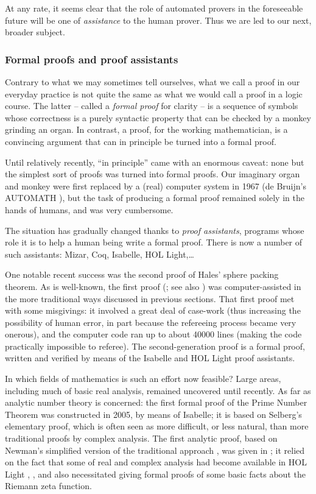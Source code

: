 At any rate, it seems clear that the role of automated provers in the
foreseeable future will be one of {\em assistance} to the human prover.
Thus we are led to our next, broader subject.

\subsubsection{Formal proofs and proof assistants}

Contrary to what we may sometimes tell ourselves,
what we call a proof in our everyday practice is not quite the same as what
we would call a proof in a logic course. The latter -- called a
{\em formal proof} for clarity -- is a sequence of symbols whose
correctness is a purely
syntactic property that can be checked by a monkey grinding
an organ. In contrast, a proof, for the working mathematician, is a convincing
argument that can in principle be turned into a formal proof.

Until relatively
recently, ``in principle'' came with an enormous caveat: none but the
simplest sort of proofs was turned into formal proofs. Our imaginary
organ and monkey were first replaced by a (real) computer system in 1967
(de Bruijn's AUTOMATH \cite{de1970mathematical}),
but the task of producing a formal proof remained solely
in the hands of humans, and was very cumbersome.

The situation has
gradually changed thanks to {\em proof assistants}, programs whose role it is
to help a human being write a formal proof. There is now a number of such
assistants: Mizar, Coq, Isabelle, HOL Light,\dots

One notable recent success was the second proof of Hales'
sphere packing theorem. As is well-known, the first proof
(\cite{Hales2005}; see also \cite{lagarias2011kepler}) 
was computer-assisted in the more traditional ways discussed in previous
sections. That first proof
met with some misgivings: it involved a great deal of case-work
(thus increasing the possibility of human error, in part because
the
refereeing process became very onerous), and the computer code 
ran up to about 40000 lines (making the code practically impossible to referee).
The second-generation proof \cite{Halesetal2017a} is a formal proof,
written and verified by means of the Isabelle and HOL Light proof assistants.

In which fields of mathematics is such an effort now feasible?
Large areas, including much of basic real analysis, remained uncovered until
recently. As far as analytic number theory is concerned: the first formal
proof of the Prime Number Theorem \cite{avigad2007formally} was constructed
in 2005, by means of Isabelle; it is based on Selberg's elementary proof,
which is
often seen as more difficult, or less natural, than more traditional proofs
by complex analysis. The first analytic proof, based on Newman's simplified
version of the traditional approach \cite{newman1980simple}, was given in
\cite{harrison-pnt}; it relied on the fact that some of real and complex analysis had become available in HOL Light \cite{harrison2005hol}, \cite{harrison2007formalizing}, and also necessitated giving
formal proofs of some basic facts about the Riemann zeta function. 

